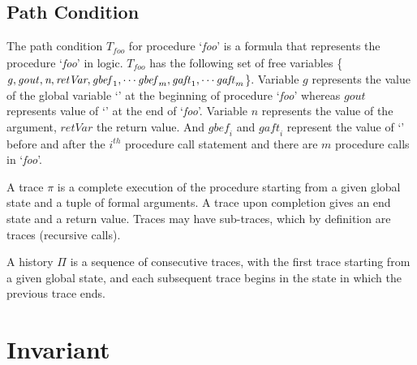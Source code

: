 \documentclass{llncs}
\newcommand{\foo}{\textit{foo}}
\newcommand{\trace}{\pi}
\newcommand{\history}{\Pi}
\newcommand{\pathCondition}{\mathit{T_{\foo}}}
\newcommand{\retVar}{\textit{retVar}}
\newcommand{\n}{\textit{n}}
\newcommand{\g}{\mathit{g}}
\newcommand{\gout}{\mathit{gout}}
\newcommand{\gbef}{\mathit{gbef}}
\newcommand{\gaft}{\mathit{gaft}}
\begin{document}
\subsection{Path Condition}

  The path condition $\pathCondition$ for procedure `\foo' is a
  formula that represents the procedure `\foo' in logic.
  $\pathCondition$ has the following set of free variables \{$\g,
  \gout,\n,\\ \retVar, \gbef_1, \cdots \gbef_m, \gaft_1, \cdots
  \gaft_m$\}. Variable $\g$ represents the value of the global
  variable `\g' at the beginning of procedure `\foo' whereas $\gout$
  represents value of `\g' at the end of `\foo'. Variable $\n$
  represents the value of the argument, $\retVar$ the return
  value. And $\gbef_i$ and $\gaft_i$ represent the value of `\g' before
  and after the $i^{th}$ procedure call statement and there are $m$
  procedure calls in `\foo'.

\begin{definition}[trace]
  A trace $\trace$ is a complete execution of the procedure starting
  from a given global state and a tuple of formal arguments. A trace
  upon completion gives an end state and a return value. Traces may
  have sub-traces, which by definition are traces (recursive calls).
\end{definition}

\begin{definition}[history]
  A history $\history$ is a sequence of consecutive traces, with the
  first trace starting from a given global state, and each subsequent
  trace begins in the state in which the previous trace ends.
\end{definition}

\section{Invariant}
\end{document}
